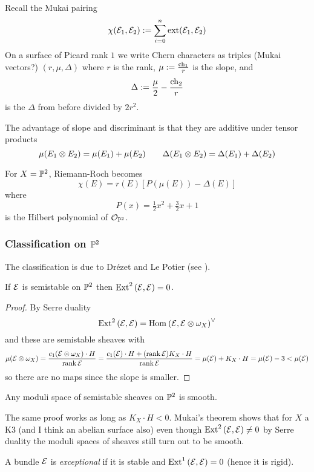 \documentclass[12pt]{article}
\begin{document}
Recall the Mukai pairing
\[ \chi(\E_1, \E_2) := \sum_{i = 0}^n \mathrm{ext}(\E_1, \E_2) \]
On a surface of Picard rank $1$ we write Chern characters as triples (Mukai vectors?) $(r, \mu, \Delta)$ where $r$ is the rank, $\mu := \frac{\ch_1}{r}$ is the slope, and 
\[ \Delta := \frac{\mu}{2} - \frac{\ch_2}{r} \]
is the $\Delta$ from before divided by $2 r^2$.

\begin{rmk}
The advantage of slope and discriminant is that they are additive under tensor products
\[ \mu(E_1 \ot E_2) = \mu(E_1) + \mu(E_2) \quad \quad \Delta(E_1 \ot E_2) = \Delta(E_1) + \Delta(E_2) \]
\end{rmk}

For $X = \P^2$, Riemann-Roch becomes
\[ \chi(E) = r(E) \left[ P(\mu(E)) - \Delta(E) \right] \]
where
\[ P(x) = \tfrac{1}{2} x^2 + \tfrac{3}{2} x + 1 \]
is the Hilbert polynomial of $\struct{\P^2}$.

\subsubsection{Classification on $\P^2$}


The classification is due to Dr\'{e}zet and Le Potier (see ).

\begin{lemma}
If $\E$ is semistable on $\P^2$ then $\Ext{2}{}{\E}{\E} = 0$.
\end{lemma}

\begin{proof}
By Serre duality
\[ \Ext{2}{}{\E}{\E} = \Hom{}{\E}{\E \ot \omega_X}^{\vee} \]
and these are semistable sheaves with
\[ \mu(\E \ot \omega_X) = \frac{c_1(\E \ot \omega_X) \cdot H}{\rank{\E}} = \frac{c_1(\E) \cdot H + (\rank{\E}) K_X \cdot H}{\rank{\E}} = \mu(\E) + K_X \cdot H = \mu(\E) - 3 < \mu(\E) \]
so there are no maps since the slope is smaller. 
\end{proof}

\begin{cor}
Any moduli space of semistable sheaves on $\P^2$ is smooth. 
\end{cor}

The same proof works as long as $K_X \cdot H < 0$. Mukai's theorem shows that for $X$ a K3 (and I think an abelian surface also) even though $\Ext{2}{}{\E}{\E} \neq 0$ by Serre duality the moduli spaces of sheaves still turn out to be smooth.

\begin{defn}
A bundle $\E$ is \textit{exceptional} if it is stable and $\Ext{1}{}{\E}{\E} = 0$ (hence it is rigid).
\end{defn}
\end{document}
